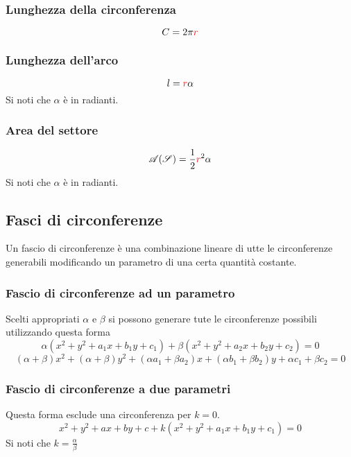 \subsubsection{Lunghezza della circonferenza}
\begin{equation*}
  C = 2\pi\mathcolor{red}{r}
\end{equation*}

\subsubsection{Lunghezza dell'arco}
\begin{equation*}
  l = \mathcolor{red}{r}\alpha
\end{equation*}
Si noti che $\alpha$ è in radianti.

\subsubsection{Area del settore}
\begin{equation*}
  \mathscr{A}(\mathscr{S}) = \frac{1}{2}\mathcolor{red}{r}^2\alpha
\end{equation*}
Si noti che $\alpha$ è in radianti.

\subsection{Fasci di circonferenze}\label{subsec:geomanal:fasciocirc}
Un fascio di circonferenze è una combinazione lineare di utte le circonferenze generabili modificando
un parametro di una certa quantità costante.

\subsubsection{Fascio di circonferenze ad un parametro}
Scelti appropriati $\alpha$ e $\beta$ si possono generare tute le circonferenze possibili utilizzando 
questa forma
\begin{equation*}
  \alpha(x^2+y^2+a_1x+b_1y+c_1) + \beta(x^2+y^2+a_2x+b_2y+c_2) = 0
\end{equation*}
\begin{equation*}
  (\alpha+\beta)x^2+(\alpha+\beta)y^2+(\alpha a_1+\beta a_2)x+(\alpha b_1+\beta b_2)y+
  \alpha c_1+\beta c_2 = 0
\end{equation*}

\subsubsection{Fascio di circonferenze a due parametri}
Questa forma esclude una circonferenza per $k=0$.
\begin{equation*}
  x^2+y^2+ax+by+c+k(x^2+y^2+a_1x+b_1y+c_1) = 0
\end{equation*}
Si noti che $k=\frac{\alpha}{\beta}$

